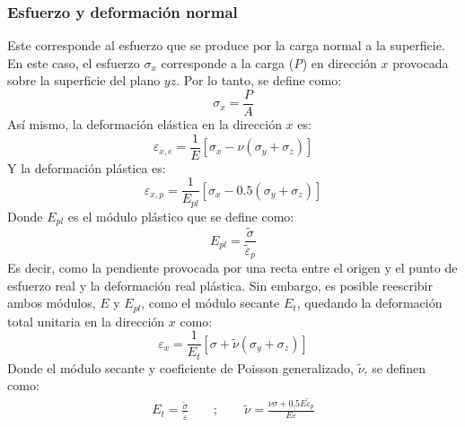 \subsubsection{Esfuerzo y deformación normal}
Este corresponde al esfuerzo que se produce por la carga normal a la superficie. En este caso, el esfuerzo $\sigma_{x}$ corresponde a la carga (\textit{P}) en dirección $x$ provocada sobre la superficie del plano $yz$. Por lo tanto, se define como:
\begin{equation}
	\sigma_{x} = \frac{P}{A}
\end{equation}
Así mismo, la deformación elástica en la dirección $x$ es:
\begin{equation}
	\varepsilon_{x,e} = \frac{1}{E}\left[\sigma_x - \nu (\sigma_y + \sigma_z)\right]
\end{equation}
Y la deformación plástica es:
\begin{equation}
	\varepsilon_{x,p} = \frac{1}{E_{pl}} \left[ \sigma_x - 0.5(\sigma_y + \sigma_z)\right]
\end{equation}
Donde $E_{pl}$ es el módulo plástico que se define como:
\begin{equation}
	E_{pl} = \frac{\tilde{\sigma}}{\tilde{\varepsilon}_p}
\end{equation}
Es decir, como la pendiente provocada por una recta entre el origen y el punto de esfuerzo real y la deformación real plástica. Sin embargo, es posible reescribir ambos módulos, $E$ y $E_{pl}$, como el módulo secante $E_t$, quedando la deformación total unitaria en la dirección $x$ como:
\begin{equation}
	\varepsilon_x = \frac{1}{E_t} \left[\sigma + \tilde{\nu}(\sigma_y + \sigma_z)\right]
\end{equation}
Donde el módulo secante y coeficiente de Poisson generalizado, $\tilde{\nu}$, se definen como:
\begin{gather*}
	E_t = \frac{\tilde{\sigma}}{\tilde{\varepsilon}} \qquad ; \qquad \tilde{\nu} = \frac{\nu\sigma + 0.5E\tilde{\varepsilon}_p}{E\varepsilon}
\end{gather*}

